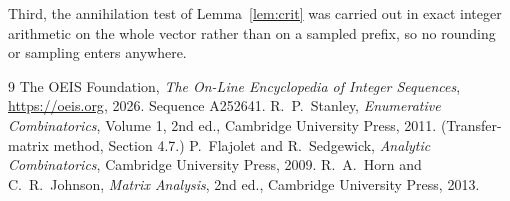 \documentclass[11pt,a4paper]{article}
\theoremstyle{plain}
\theoremstyle{definition}
\begin{document}
Third, the annihilation test of Lemma~\ref{lem:crit} was carried out in exact integer
arithmetic on the whole vector rather than on a sampled prefix, so no rounding or sampling
enters anywhere.

\begin{thebibliography}{9}
 The OEIS Foundation, \emph{The On-Line Encyclopedia of Integer
Sequences}, \url{https://oeis.org}, 2026. Sequence A252641.
 R.~P.~Stanley, \emph{Enumerative Combinatorics}, Volume 1, 2nd ed.,
Cambridge University Press, 2011. (Transfer-matrix method, Section 4.7.)
 P.~Flajolet and R.~Sedgewick, \emph{Analytic Combinatorics}, Cambridge
University Press, 2009.
 R.~A.~Horn and C.~R.~Johnson, \emph{Matrix Analysis}, 2nd ed., Cambridge
University Press, 2013.
\end{thebibliography}
\end{document}
